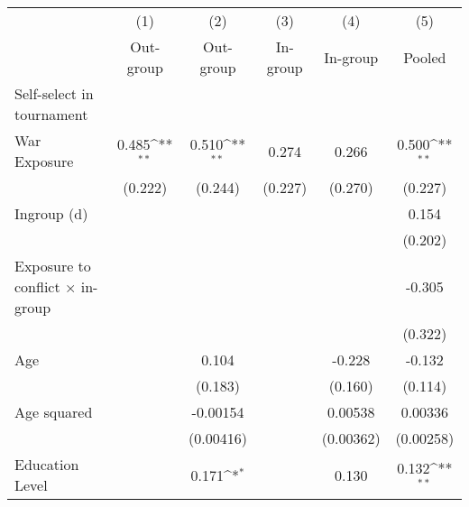{
\def\sym#1{\ifmmode^{#1}\else\(^{#1}\)\fi}
\begin{tabular}{l*{5}{c}}
\hline\hline
                    &\multicolumn{1}{c}{(1)}&\multicolumn{1}{c}{(2)}&\multicolumn{1}{c}{(3)}&\multicolumn{1}{c}{(4)}&\multicolumn{1}{c}{(5)}\\
                    &\multicolumn{1}{c}{Out-group}&\multicolumn{1}{c}{Out-group}&\multicolumn{1}{c}{In-group}&\multicolumn{1}{c}{In-group}&\multicolumn{1}{c}{Pooled}\\
\hline
Self-select in tournament&                     &                     &                     &                     &                     \\
War Exposure        &       0.485\sym{**} &       0.510\sym{**} &       0.274         &       0.266         &       0.500\sym{**} \\
                    &     (0.222)         &     (0.244)         &     (0.227)         &     (0.270)         &     (0.227)         \\
[1em]
Ingroup (d)         &                     &                     &                     &                     &       0.154         \\
                    &                     &                     &                     &                     &     (0.202)         \\
[1em]
Exposure to conflict × in-group&                     &                     &                     &                     &      -0.305         \\
                    &                     &                     &                     &                     &     (0.322)         \\
[1em]
Age                 &                     &       0.104         &                     &      -0.228         &      -0.132         \\
                    &                     &     (0.183)         &                     &     (0.160)         &     (0.114)         \\
[1em]
Age squared         &                     &    -0.00154         &                     &     0.00538         &     0.00336         \\
                    &                     &   (0.00416)         &                     &   (0.00362)         &   (0.00258)         \\
[1em]
Education Level     &                     &       0.171\sym{*}  &                     &       0.130         &       0.132\sym{**} \\

\end{tabular}}
